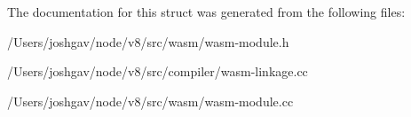 The documentation for this struct was generated from the following files\+:\begin{DoxyCompactItemize}
\item 
/\+Users/joshgav/node/v8/src/wasm/wasm-\/module.\+h\item 
/\+Users/joshgav/node/v8/src/compiler/wasm-\/linkage.\+cc\item 
/\+Users/joshgav/node/v8/src/wasm/wasm-\/module.\+cc\end{DoxyCompactItemize}
